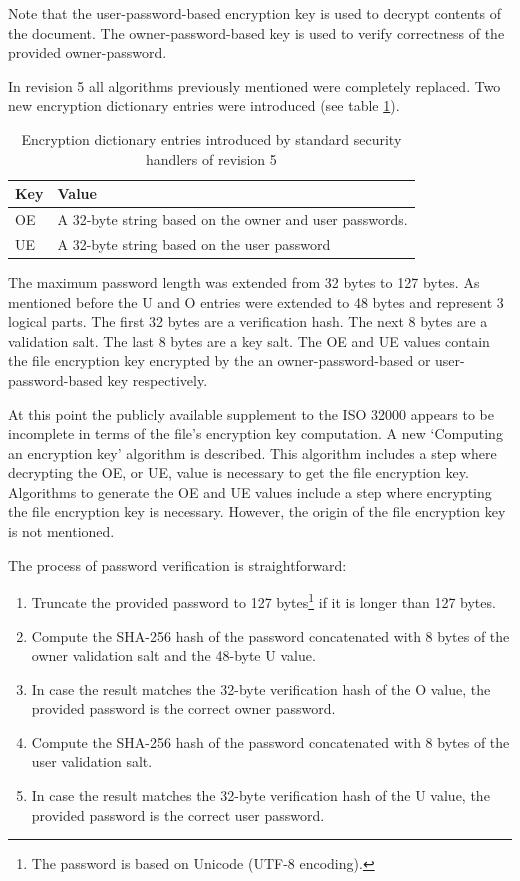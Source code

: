 \documentclass[11pt,oneside]{fithesis2}
\begin{document}
Note that the user-password-based encryption key is used to decrypt contents of the document. The owner-password-based key is used to verify correctness of the provided owner-password.

In revision 5 all algorithms previously mentioned were completely replaced. Two new encryption dictionary entries were introduced (see table \ref{additional_handler_entries}). 

\begin{table}[h]
	\centering
	\begin{tabular}{|l|l|}
               \hline
		\textbf{Key}&\textbf{Value}\\
	\hline
		OE&A 32-byte string based on the owner and user passwords.\\
		UE&A 32-byte string based on the user password\\
	\hline
           \end{tabular}
	\caption{Encryption dictionary entries introduced by standard security handlers of revision 5}
	\label{additional_handler_entries}
\end{table}

The maximum password length was extended from 32 bytes to 127 bytes. As mentioned before the U and O entries were extended to 48 bytes and represent 3 logical parts. The first 32 bytes are a verification hash. The next 8 bytes are a validation salt. The last 8 bytes are a key salt. The OE and UE values contain the file encryption key encrypted by the an owner-password-based or user-password-based key respectively.

At this point the publicly available supplement to the ISO 32000 \cite{iso32000sup} appears to be incomplete in terms of the file's encryption key computation. A new ‘Computing an encryption key’ algorithm is described. This algorithm includes a step where decrypting the OE, or UE, value is necessary to get the file encryption key. Algorithms to generate the OE and UE values include a step where encrypting the file encryption key is necessary. However, the origin of the file encryption key is not mentioned. 

The process of password verification is straightforward:

\begin{enumerate}
\setlength\itemsep{0.1em}
\item{Truncate the provided password to 127 bytes\footnote{The password is based on Unicode (UTF-8 encoding).} if it is longer than 127 bytes.}
\item{Compute the SHA-256 hash of the password concatenated with 8 bytes of the owner validation salt and the 48-byte U value.}
\item{In case the result matches the 32-byte verification hash of the O value, the provided password is the correct owner password.}
\item{Compute the SHA-256 hash of the password concatenated with 8 bytes of the user validation salt.}
\item{In case the result matches the 32-byte verification hash of the U value, the provided password is the correct user password.}
\end{enumerate}
\end{document}
